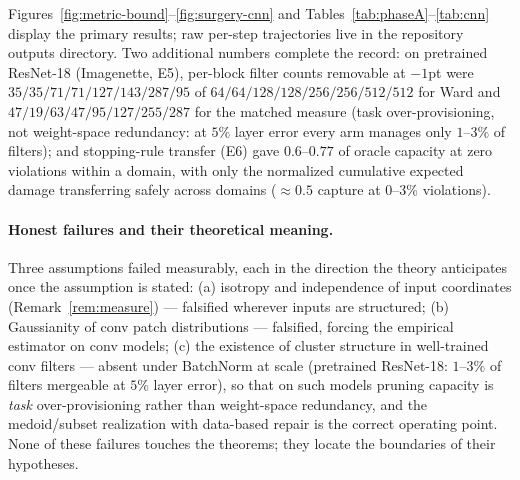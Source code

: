 \documentclass[11pt]{article}
\theoremstyle{remark}
\begin{document}
Figures~\ref{fig:metric-bound}--\ref{fig:surgery-cnn} and
Tables~\ref{tab:phaseA}--\ref{tab:cnn} display the primary results;
raw per-step trajectories live in the repository outputs directory.
Two additional numbers complete the record: on pretrained ResNet-18
(Imagenette, E5), per-block filter counts removable at $-1$pt were
$35/35/71/71/127/143/287/95$ of $64/64/128/128/256/256/512/512$ for Ward and
$47/19/63/47/95/127/255/287$ for the matched measure (task over-provisioning,
not weight-space redundancy: at $5\%$ layer error every arm manages only
$1$--$3\%$ of filters); and stopping-rule transfer (E6) gave
$0.6$--$0.77$ of oracle capacity at zero violations within a domain, with
only the normalized cumulative expected damage transferring safely across
domains ($\approx 0.5$ capture at $0$--$3\%$ violations).

\paragraph{Honest failures and their theoretical meaning.}
Three assumptions failed measurably, each in the direction the theory
anticipates once the assumption is stated: (a) isotropy and independence of
input coordinates (Remark~\ref{rem:measure}) --- falsified wherever inputs
are structured; (b) Gaussianity of conv patch distributions --- falsified,
forcing the empirical estimator on conv models; (c) the existence of cluster
structure in well-trained conv filters --- absent under BatchNorm at scale
(pretrained ResNet-18: $1$--$3\%$ of filters mergeable at $5\%$ layer error),
so that on such models pruning capacity is \emph{task} over-provisioning
rather than weight-space redundancy, and the medoid/subset realization with
data-based repair is the correct operating point. None of these failures
touches the theorems; they locate the boundaries of their hypotheses.
\end{document}
